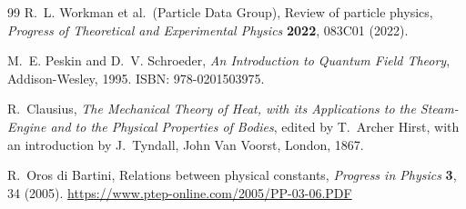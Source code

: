 \documentclass[aps,pra,preprint,longbibliography,nofootinbib]{revtex4-2}
\begin{document}
\begin{thebibliography}{99}
R.~L. Workman et al.\ (Particle Data Group),
Review of particle physics,
\textit{Progress of Theoretical and Experimental Physics}
\textbf{2022}, 083C01 (2022).

M.~E. Peskin and D.~V. Schroeder,
\textit{An Introduction to Quantum Field Theory},
Addison-Wesley, 1995.
ISBN: 978-0201503975.

R.~Clausius,
\textit{The Mechanical Theory of Heat, with its Applications to the
Steam-Engine and to the Physical Properties of Bodies},
edited by T.~Archer Hirst, with an introduction by J.~Tyndall,
John Van Voorst, London, 1867.

R.~Oros di Bartini,
Relations between physical constants,
\textit{Progress in Physics} \textbf{3}, 34 (2005).
\url{https://www.ptep-online.com/2005/PP-03-06.PDF}

\end{thebibliography}
\end{document}
